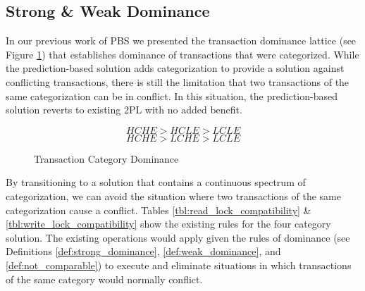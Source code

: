 \subsection{Strong \& Weak Dominance}
\label{sec:dominance}

In our previous work of \ac{PBS} we presented the transaction dominance lattice (see Figure \ref{fig:category_lattice_2}) that establishes dominance of transactions that were categorized. While the prediction-based solution adds categorization to provide a solution against conflicting transactions, there is still the limitation that two transactions of the same categorization can be in conflict. In this situation, the prediction-based solution reverts to existing 2PL with no added benefit.


\[\textrm{$HCHE > HCLE > LCLE$}\]
\[\textrm{$HCHE > LCHE > LCLE$} \]

\begin{figure}[h]
\captionsetup{justification=centering}
\centering %


\caption{Transaction Category Dominance} %
\label{fig:category_lattice_2} %

\end{figure}

By transitioning to a solution that contains a continuous spectrum of categorization, we can avoid the situation where two transactions of the same categorization cause a conflict. Tables \ref{tbl:read_lock_compatibility} \& \ref{tbl:write_lock_compatibility} show the existing rules for the four category solution. The existing operations would apply given the rules of dominance (see Definitions \ref{def:strong_dominance}, \ref{def:weak_dominance}, and \ref{def:not_comparable}) to execute and eliminate situations in which transactions of the same category would normally conflict.

